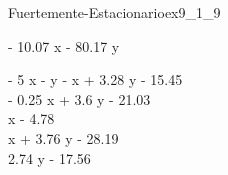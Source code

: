 
\begin{bilevelmodel}{Fuertemente-Estacionario}{ex9_1_9}
    \begin{upperlevel}{- 10.07 x - 80.17 y}{
        
    }
    \end{upperlevel}
    \begin{lowerlevel}{- 5 x - y}{
         - x + 3.28 y - 15.45  \\ 
 - 0.25 x + 3.6 y - 21.03  \\ 
 x - 4.78  \\ 
 x + 3.76 y - 28.19  \\ 
 2.74 y - 17.56 
    }
    \end{lowerlevel}
\end{bilevelmodel}
    
        